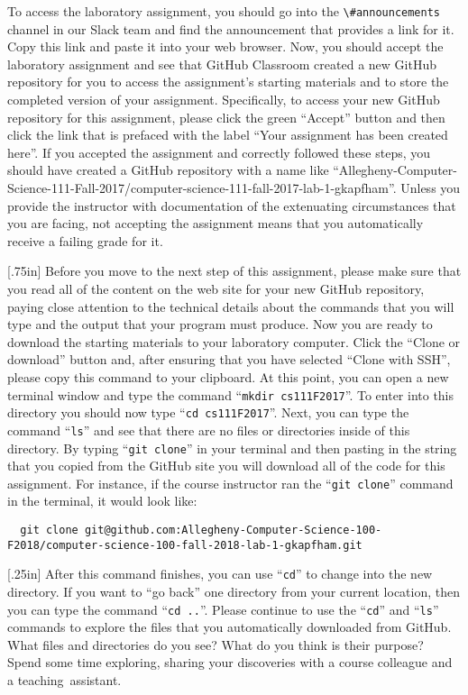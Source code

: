 \documentclass[11pt]{article}
\newcommand{\command}[1]{``\lstinline{#1}''}
\newcommand{\channel}[1]{\lstinline{#1}}
\newcommand{\step}[1]{``{#1}''}
\newcommand{\caution}[1]{\null\hfill\LARGE{\faWarning{}}\newline\scriptsize{\em{#1}}}
\newcommand{\discuss}[1]{\null\hfill\LARGE{\faCommentO{}}\newline\scriptsize{\em{#1}}}
\begin{document}
To access the laboratory assignment, you should go into the
\channel{\#announcements} channel in our Slack team and find the announcement
that provides a link for it. Copy this link and paste it into your web browser.
Now, you should accept the laboratory assignment and see that GitHub Classroom
created a new GitHub repository for you to access the assignment's starting
materials and to store the completed version of your assignment. Specifically,
to access your new GitHub repository for this assignment, please click the
green ``Accept'' button and then click the link that is prefaced with the label
``Your assignment has been created here''. If you accepted the assignment and
correctly followed these steps, you should have created a GitHub repository
with a name like
``Allegheny-Computer-Science-111-Fall-2017/computer-science-111-fall-2017-lab-1-gkapfham''.
Unless you provide the instructor with documentation of the extenuating
circumstances that you are facing, not accepting the assignment means that you
automatically receive a failing grade for it.

\marginnote{\caution{Clone GitHub repository}}[.75in] Before you move to the
next step of this assignment, please make sure that you read all of the content
on the web site for your new GitHub repository, paying close attention to the
technical details about the commands that you will type and the output that
your program must produce. Now you are ready to download the starting materials
to your laboratory computer. Click the ``Clone or download'' button and, after
ensuring that you have selected ``Clone with SSH'', please copy this command to
your clipboard. At this point, you can open a new terminal window and type the
command \command{mkdir cs111F2017}. To enter into this directory you should now
type \command{cd cs111F2017}. Next, you can type the command \command{ls} and
see that there are no files or directories inside of this directory. By typing
\command{git clone} in your terminal and then pasting in the string that you
copied from the GitHub site you will download all of the code for this
assignment. For instance, if the course instructor ran the \command{git clone}
command in the terminal, it would look like:

\begin{lstlisting}
  git clone git@github.com:Allegheny-Computer-Science-100-F2018/computer-science-100-fall-2018-lab-1-gkapfham.git
\end{lstlisting}

\marginnote{\discuss{Use terminal commands}}[.25in] After this command
finishes, you can use \command{cd} to change into the new directory. If you
want to \step{go back} one directory from your current location, then you can
type the command \command{cd ..}. Please continue to use the \command{cd} and
\command{ls} commands to explore the files that you automatically downloaded
from GitHub. What files and directories do you see? What do you think is their
purpose? Spend some time exploring, sharing your discoveries with a course
colleague and a \mbox{teaching assistant}.
\end{document}
